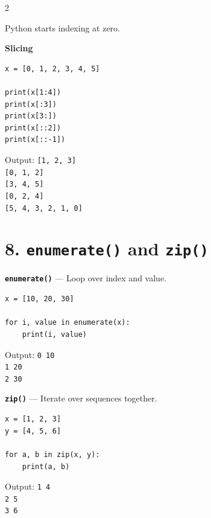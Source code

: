 \documentclass[10pt,a4paper]{article}
\begin{document}
\begin{multicols}{2}
\begin{card}
Python starts indexing at zero.
\end{card}

\begin{card}
\textbf{Slicing}

\begin{lstlisting}[style=pythonstyle]
x = [0, 1, 2, 3, 4, 5]

print(x[1:4])
print(x[:3])
print(x[3:])
print(x[::2])
print(x[::-1])
\end{lstlisting}

Output:
\texttt{[1, 2, 3]}\\
\texttt{[0, 1, 2]}\\
\texttt{[3, 4, 5]}\\
\texttt{[0, 2, 4]}\\
\texttt{[5, 4, 3, 2, 1, 0]}
\end{card}

\section*{8. \texttt{enumerate()} and \texttt{zip()}}

\begin{card}
\textbf{\texttt{enumerate()}} --- Loop over index and value.

\begin{lstlisting}[style=pythonstyle]
x = [10, 20, 30]

for i, value in enumerate(x):
    print(i, value)
\end{lstlisting}

Output:
\texttt{0 10}\\
\texttt{1 20}\\
\texttt{2 30}
\end{card}

\begin{card}
\textbf{\texttt{zip()}} --- Iterate over sequences together.

\begin{lstlisting}[style=pythonstyle]
x = [1, 2, 3]
y = [4, 5, 6]

for a, b in zip(x, y):
    print(a, b)
\end{lstlisting}

Output:
\texttt{1 4}\\
\texttt{2 5}\\
\texttt{3 6}
\end{card}


\end{multicols}
\end{document}
